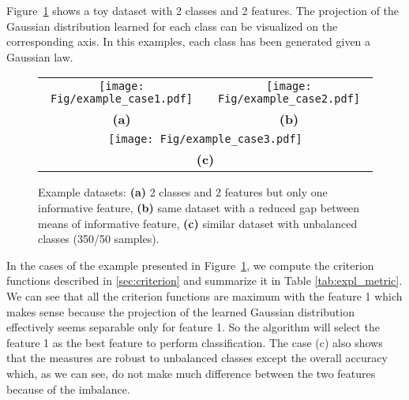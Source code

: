 \documentclass[a4paper,11pt,DIV=16,abstracton]{scrartcl}
\begin{document}
            Figure~\ref{fig:expl_dataset} shows a toy dataset with 2 classes and 2 features. The projection of the Gaussian distribution learned for each class can be visualized on the corresponding axis. In this examples, each class has been generated given a Gaussian law.

            \begin{figure}[!ht]
                \centering
                \begin{tabular}{cc}
                    \texttt{[image: Fig/example\_case1.pdf]} &
                    \texttt{[image: Fig/example\_case2.pdf]} \\
                    {\bfseries{(a)}} & {\bfseries{(b)}} \\
                    \multicolumn{2}{c}{\texttt{[image: Fig/example\_case3.pdf]}} \\
                    \multicolumn{2}{c}{{\bfseries{(c)}}} \\
                \end{tabular}
                \caption{Example datasets: {\bfseries{(a)}} 2 classes and 2 features but only one informative feature, {\bfseries{(b)}} same dataset with a reduced gap between means of informative feature, {\bfseries{(c)}} similar dataset with unbalanced classes (350/50 samples).\label{fig:expl_dataset}}
            \end{figure}

            In the cases of the example presented in Figure~\ref{fig:expl_dataset}, we compute the criterion functions described in \ref{sec:criterion} and summarize it in Table \ref{tab:expl_metric}. We can see that all the criterion functions are maximum with the feature 1 which makes sense because the projection of the learned Gaussian distribution effectively seems separable only for feature 1. So the algorithm will select the feature 1 as the best feature to perform classification. The case (c) also shows that the measures are robust to unbalanced classes except the overall accuracy which, as we can see, do not make much difference between the two features because of the imbalance.
\end{document}
